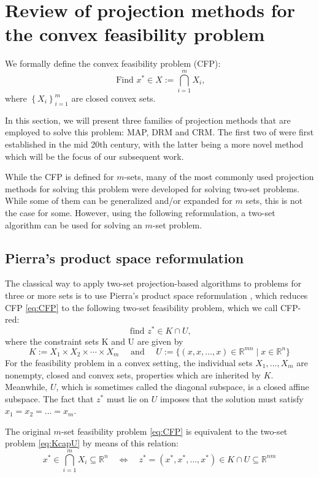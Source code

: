 \documentclass[smallextended,numbook,nospthms]{svjour3}
\theoremstyle{plain}
\theoremstyle{definition}
\def\RR{\mathds R}
\begin{document}
\newpage
\section{Review of projection methods for the convex feasibility problem}\label{sec:proj methods}

We formally define the convex feasibility problem (CFP):
\begin{equation}\label{eq:CFP}
	\text{ Find } x^{*} \in X:=\bigcap_{i=1}^{m} X_{i},
\end{equation}
where $\left\{X_{i}\right\}_{i=1}^{m}$ are closed convex sets.

In this section, we will present three families of projection methods that are employed to solve this problem: MAP, DRM and CRM. The first two of were first established in the mid 20th century, with the latter being a more novel method which will be the focus of our subsequent work.

While the CFP is defined for $m$-sets, many of the most commonly used projection methods for solving this problem were developed for solving two-set problems. While some of them can be generalized and/or expanded for $m$ sets, this is not the case for some. However, using the following reformulation, a two-set algorithm can be used for solving an $m$-set problem.

\subsection{Pierra's product space reformulation}\label{subsec:Pierra}
The classical way to apply two-set projection-based algorithms to problems for three or more sets is to use Pierra's product space reformulation \cite{Pierra:1984hl}, which reduces CFP \cref{eq:CFP} to the following two-set feasibility problem, which we call CFP-red:
\[
\text{ find } z^{*}\in K\cap U,  \label{eq:KcapU}
\]
where the constraint sets $\mathrm{K}$ and $\mathrm{U}$ are given by
\[
K:=X_{1} \times X_{2} \times \cdots \times X_{m} \quad \text { and } \quad U:=\{(x, x, \ldots, x) \in \RR^{mn} \mid x \in \RR^{n}\}
\]
For the feasibility problem in a convex setting, the individual sets $X_{1}, \ldots, X_{m}$ are nonempty, closed and convex sets, properties which are inherited by $K$. Meanwhile, $U$, which is sometimes called the diagonal subspace, is a closed affine subspace. The fact that $z^*$ must lie on $U$ imposes that the solution must satisfy $x_{1}=x_{2}=\dots=x_{m}$.

The original $m$-set feasibility problem \cref{eq:CFP} is equivalent to the two-set problem \cref{eq:KcapU} by means of this relation:
\begin{equation}
	x^{*} \in \bigcap_{i=1}^{m} X_{i} \subseteq \RR^n \quad \iff \quad z^{*}=(x^{*}, x^{*}, \ldots, x^{*}) \in K \cap U \subseteq \RR^{nm} \label{eq:Pierra}
\end{equation}
\end{document}
